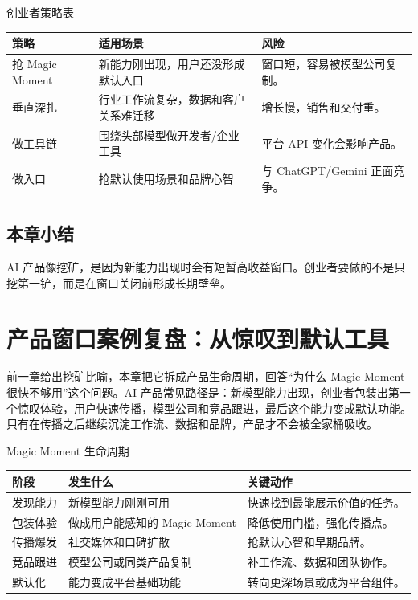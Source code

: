 \documentclass[a4paper]{article}
\begin{document}
\begin{knowledgebox}{创业者策略表}
\begin{tabularx}{\textwidth}{p{}p{}X}
\toprule
策略 & 适用场景 & 风险 \\
\midrule
抢 Magic Moment & 新能力刚出现，用户还没形成默认入口 & 窗口短，容易被模型公司复制。 \\
垂直深扎 & 行业工作流复杂，数据和客户关系难迁移 & 增长慢，销售和交付重。 \\
做工具链 & 围绕头部模型做开发者/企业工具 & 平台 API 变化会影响产品。 \\
做入口 & 抢默认使用场景和品牌心智 & 与 ChatGPT/Gemini 正面竞争。 \\
\bottomrule
\end{tabularx}
\end{knowledgebox}

\subsection{本章小结}

AI 产品像挖矿，是因为新能力出现时会有短暂高收益窗口。创业者要做的不是只挖第一铲，而是在窗口关闭前形成长期壁垒。

\section{产品窗口案例复盘：从惊叹到默认工具}

前一章给出挖矿比喻，本章把它拆成产品生命周期，回答“为什么 Magic Moment 很快不够用”这个问题。AI 产品常见路径是：新模型能力出现，创业者包装出第一个惊叹体验，用户快速传播，模型公司和竞品跟进，最后这个能力变成默认功能。只有在传播之后继续沉淀工作流、数据和品牌，产品才不会被全家桶吸收。

\begin{knowledgebox}{Magic Moment 生命周期}
\begin{tabularx}{\textwidth}{p{}p{}X}
\toprule
阶段 & 发生什么 & 关键动作 \\
\midrule
发现能力 & 新模型能力刚刚可用 & 快速找到最能展示价值的任务。 \\
包装体验 & 做成用户能感知的 Magic Moment & 降低使用门槛，强化传播点。 \\
传播爆发 & 社交媒体和口碑扩散 & 抢默认心智和早期品牌。 \\
竞品跟进 & 模型公司或同类产品复制 & 补工作流、数据和团队协作。 \\
默认化 & 能力变成平台基础功能 & 转向更深场景或成为平台组件。 \\
\bottomrule
\end{tabularx}
\end{knowledgebox}
\end{document}

